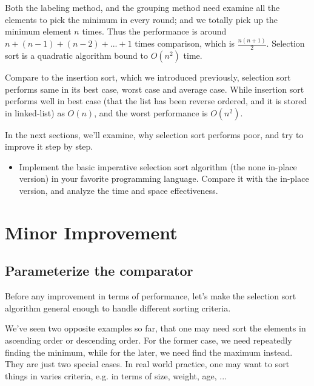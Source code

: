 \documentclass{article}
\begin{document}
Both the labeling method, and the grouping method need examine all the elements to
pick the minimum in every round; and we totally pick up the minimum element $n$ times.
Thus the performance is around $n + (n-1) + (n-2) + ... + 1$ times comparison, which is $\frac{n(n+1)}{2}$.
Selection sort is a quadratic algorithm bound to $O(n^2)$ time.

Compare to the insertion sort, which we introduced previously, selection sort
performs same in its best case, worst case and average case. While insertion
sort performs well in best case (that the list has been reverse ordered, and it is stored
in linked-list) as $O(n)$, and the worst performance is $O(n^2)$.

In the next sections, we'll examine, why selection sort performs poor, and try
to improve it step by step.

\begin{Exercise}

\begin{itemize}
\item Implement the basic imperative selection sort algorithm (the none in-place version)
in your favorite programming language. Compare it with the in-place version, and analyze
the time and space effectiveness.
\end{itemize}

\end{Exercise}


\section{Minor Improvement}

\subsection{Parameterize the comparator}
Before any improvement in terms of performance, let's make the selection sort
algorithm general enough to handle different sorting criteria.

We've seen two opposite examples so far, that one may need sort the elements
in ascending order or descending order. For the former case, we need
repeatedly finding the minimum, while for the later, we need find the maximum
instead. They are just two special cases. In real world practice, one
may want to sort things in varies criteria, e.g. in terms of size, weight,
age, ...
\end{document}
